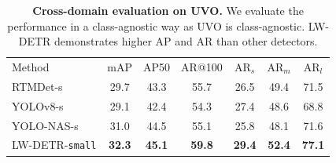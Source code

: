 \documentclass[runningheads]{llncs}
\begin{document}
\begin{table}[t]
  \centering
    \setlength{\tabcolsep}{14pt}
    \renewcommand{\arraystretch}{1.41}
    \tiny
  \caption{\textbf{Cross-domain evaluation on UVO.} We evaluate the performance in a class-agnostic way as UVO is class-agnostic. LW-DETR demonstrates higher AP and AR than other detectors.}
  \vspace{-1mm}
    \begin{tabular}{l|cc|cccc}
    Method & mAP & AP50 & AR@100 & AR$_s$ & AR$_m$ & AR$_l$ \\
    \shline
    RTMDet-s & 29.7 & 43.3 & 55.7 & 26.5 & 49.4 & 71.5\\
    YOLOv8-s & 29.1 & 42.4 & 54.3 & 27.4  & 48.6 & 68.8\\
    YOLO-NAS-s & 31.0 & 44.5 & 55.1 & 25.8  & 48.1 & 71.6 \\
    LW-DETR-\texttt{small} & \textbf{32.3} & \textbf{45.1} & \textbf{59.8} & \textbf{29.4} & \textbf{52.4} & \textbf{77.1} \\
  \end{tabular}
  \label{tab:comparisonsonuvo}
  \vspace{-5mm}
\end{table}
\end{document}
